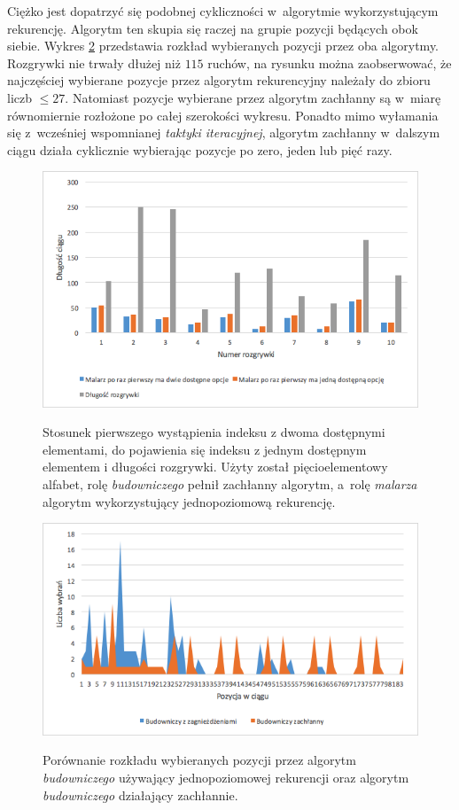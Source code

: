 \documentclass[document]{xmgr}
\begin{document}
Ciężko jest dopatrzyć się podobnej cykliczności w~algorytmie wykorzystującym rekurencję. Algorytm ten skupia się raczej na grupie pozycji będących obok siebie. Wykres \ref{fig:buildersPickedIndexes} przedstawia rozkład wybieranych pozycji przez oba algorytmy. Rozgrywki nie trwały dłużej niż $115$ ruchów, na rysunku można zaobserwować, że najczęściej wybierane pozycje przez algorytm rekurencyjny należały do zbioru liczb $\leq 27$. Natomiast pozycje wybierane przez algorytm zachłanny są w~miarę równomiernie rozłożone po całej szerokości wykresu. Ponadto mimo wyłamania się z~wcześniej wspomnianej \emph{taktyki iteracyjnej}, algorytm zachłanny w~dalszym ciągu działa cyklicznie wybierając pozycje po zero, jeden lub pięć razy.

\begin{figure}[tbh]
    \centering
    \caption{Stosunek pierwszego wystąpienia indeksu z dwoma dostępnymi elementami, do pojawienia się indeksu z jednym dostępnym elementem i dłu\-goś\-ci rozgrywki. Użyty został pięcioelementowy alfabet, rolę \emph{budowniczego} pełnił zachłanny algorytm, a~rolę \emph{malarza} algorytm wykorzystujący jed\-no\-po\-zio\-mo\-wą rekurencję.}
    \includegraphics[width = \textwidth]{images2/builder0efficiency}
    \label{fig:builder0Efficiency}
\end{figure}
\clearpage
\begin{figure}[tbh]
    \centering
    \caption{Porównanie rozkładu wybieranych pozycji przez algorytm \emph{budowniczego} używający jednopoziomowej rekurencji oraz algorytm \emph{budowniczego} działający zachłannie.}
    \includegraphics[width = \textwidth]{images2/buildersPickedIndexes}
    \label{fig:buildersPickedIndexes}
\end{figure}
\end{document}
